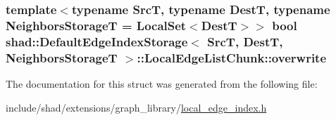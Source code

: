 \hypertarget{structshad_1_1DefaultEdgeIndexStorage_1_1LocalEdgeListChunk_af16ee8a11ee5912e40703608767038e3}{
\subsubsection[{overwrite}]{\setlength{\rightskip}{0pt plus 5cm}template$<$typename Src\-T, typename Dest\-T, typename Neighbors\-Storage\-T = Local\-Set$<$\-Dest\-T$>$$>$ bool {\bf shad\-::\-Default\-Edge\-Index\-Storage}$<$ Src\-T, Dest\-T, Neighbors\-Storage\-T $>$\-::Local\-Edge\-List\-Chunk\-::overwrite}}\label{structshad_1_1DefaultEdgeIndexStorage_1_1LocalEdgeListChunk_af16ee8a11ee5912e40703608767038e3}


The documentation for this struct was generated from the following file\-:\begin{DoxyCompactItemize}
\item 
include/shad/extensions/graph\-\_\-library/\hyperlink{local__edge__index_8h}{local\-\_\-edge\-\_\-index.\-h}\end{DoxyCompactItemize}
